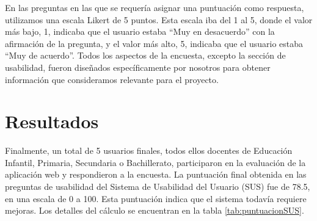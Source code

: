 En las preguntas en las que se requería asignar una puntuación como respuesta, utilizamos una escala Likert de 5 puntos. Esta escala iba del 1 al 5, donde el valor más bajo, 1, indicaba que el usuario estaba ``Muy en desacuerdo'' con la afirmación de la pregunta, y el valor más alto, 5, indicaba que el usuario estaba ``Muy de acuerdo''. Todos los aspectos de la encuesta, excepto la sección de usabilidad, fueron diseñados específicamente por nosotros para obtener información que consideramos relevante para el proyecto.

\section{Resultados}\label{sec:resultadosEvaluacion}
Finalmente, un total de 5 usuarios finales, todos ellos docentes de Educación Infantil, Primaria, Secundaria o Bachillerato, participaron en la evaluación de la aplicación web y respondieron a la encuesta. La puntuación final obtenida en las preguntas de usabilidad del Sistema de Usabilidad del Usuario (SUS) fue de 78.5, en una escala de 0 a 100. Esta puntuación indica que el sistema todavía requiere mejoras. Los detalles del cálculo se encuentran en la tabla \ref{tab:puntuacionSUS}.

